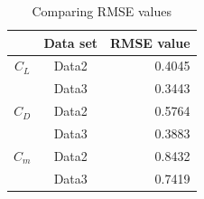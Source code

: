 \begin{table} [htbp]
  \begin{center}
    \caption{Comparing RMSE values}
    \label{tb:rmse}
    \begin{tabular}{|c||c|r|} \hline
      ~ & Data set & RMSE value \\ \hline \hline
      $C_L$ & Data2 & 0.4045 \\
       & Data3 & 0.3443 \\ \hline
       $C_D$ & Data2 & 0.5764 \\
        & Data3 & 0.3883 \\ \hline
        $C_m$ & Data2 & 0.8432 \\
         & Data3 & 0.7419 \\ \hline
    \end{tabular}
  \end{center}
\end{table}

